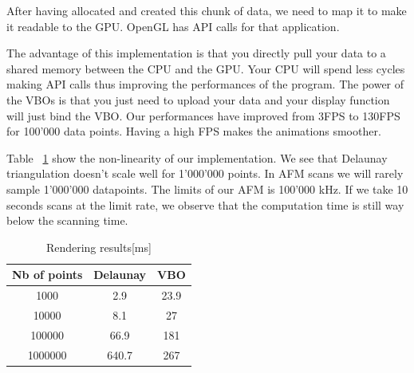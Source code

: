After having allocated and created this chunk of data, we need to map it to make it readable to the GPU. OpenGL has API calls for that application.

The advantage of this implementation is that you directly pull your data to a shared memory between the CPU and the GPU. Your CPU will spend less cycles making API calls thus improving the performances of the program. The power of the VBOs is that you just need to upload your data and your display function will just bind the VBO. Our performances have improved from 3FPS to 130FPS for 100'000 data points. Having a high FPS makes the animations smoother.

Table  ~\ref{table:nonlin} show the non-linearity of our implementation. We see that Delaunay triangulation doesn't scale well for 1'000'000 points. In AFM scans we will rarely sample 1'000'000 datapoints. The limits of our AFM is 100'000 kHz. If we take 10 seconds scans at the limit rate, we observe that the computation time is still way below the scanning time. 

\begin{table}[ht]
\caption{Rendering results[ms]} %
\centering %
\begin{tabular}{c c c} %
\hline\hline %
 Nb of points & Delaunay & VBO \\ [0.5ex] %
\hline %

1000 & 2.9 & 23.9 \\
10000 & 8.1	&	27 	\\
100000 & 66.9 & 181 \\
1000000 & 640.7	& 267 \\[1ex]


\hline %
\end{tabular}
\label{table:nonlin} %
\end{table}


